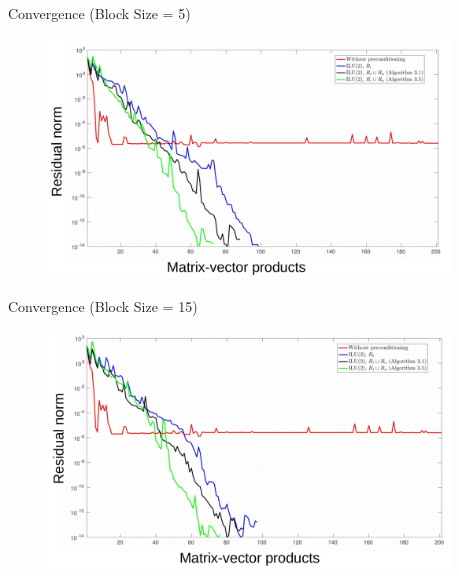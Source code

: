\documentclass{beamer}
\begin{document}
\begin{frame}{Convergence (Block Size = 5)}
\begin{figure}
\centering
\includegraphics[width=0.95\textwidth]{jac_convergence_greedy_new_5_2}
\end{figure}
\end{frame}

\begin{frame}{Convergence (Block Size = 15)}
\begin{figure}
\centering
\includegraphics[width=0.95\textwidth]{jac_convergence_greedy_new_15_2}
\end{figure}
\end{frame}
\end{document}
